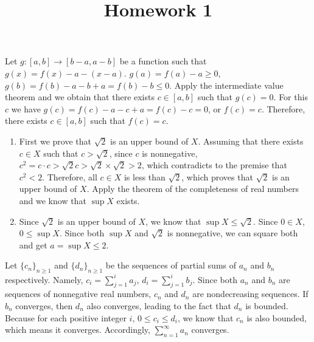 \documentclass{homework}
\title{Homework 1}
\begin{document}
\maketitle

\begin{problem}{1}
Let $g : [a, b] \to [b - a, a - b]$ be a function such that $g(x) = f(x) - a - (x - a)$. $g(a) = f(a) - a \geq 0$, $g(b) = f(b) - a - b + a = f(b) - b \leq 0$. Apply the intermediate value theorem and we obtain that there exists $c \in [a, b]$ such that $g(c) = 0$. For this $c$ we have $g(c) = f(c) - a - c + a = f(c) - c = 0$, or $f(c) = c$. Therefore, there exists $c \in [a, b]$ such that $f(c) = c$. \QED
\end{problem}

\begin{problem}{2}
\begin{enumerate}
\item First we prove that $\sqrt{2}$ is an upper bound of $X$. Assuming that there exists $c \in X$ such that $c > \sqrt{2}$, since $c$ is nonnegative, $c^2 = c \cdot c > \sqrt{2}c > \sqrt{2} \times \sqrt{2} > 2$, which contradicts to the premise that $c^2 < 2$. Therefore, all $c \in X$ is less than $\sqrt{2}$, which proves that $\sqrt{2}$ is an upper bound of $X$. Apply the theorem of the completeness of real numbers and we know that $\sup X$ exists. \QED

\item Since $\sqrt{2}$ is an upper bound of $X$, we know that $\sup X \leq \sqrt{2}$. Since $0 \in X$, $0 \leq \sup X$. Since both $\sup X$ and $\sqrt{2}$ is nonnegative, we can square both and get $a = \sup X \leq 2$. \QED
\end{enumerate}
\end{problem}

\begin{problem}{3}
Let $\{c_n\}_{n \geq 1}$ and $\{d_n\}_{n \geq 1}$ be the sequences of partial sums of $a_n$ and $b_n$ respectively. Namely, $c_i = \sum^{i}_{j=1}a_j$, $d_i = \sum^{i}_{j=1}b_j$. Since both $a_n$ and $b_n$ are sequences of nonnegative real numbers, $c_n$ and $d_n$ are nondecreasing sequences. If $b_n$ converges, then $d_n$ also converges, leading to the fact that $d_n$ is bounded. Because for each positive integer $i$, $0 \leq c_i \leq d_i$, we know that $c_n$ is also bounded, which means it converges. Accordingly, $\sum^{\infty}_{n=1}a_n$ converges. \QED
\end{problem}
\end{document}
